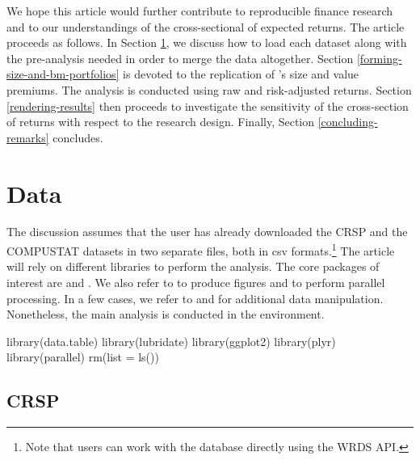 We hope this article would further contribute to reproducible finance research and to our understandings of the cross-sectional of expected returns. 
  The article proceeds as follows. In Section \ref{data}, we discuss how to load each dataset along with the pre-analysis needed in order to merge the data altogether. Section \ref{forming-size-and-bm-portfolios} is devoted to the replication of \cite{fama1993common}'s size and value premiums. The analysis is conducted using raw and risk-adjusted returns. Section \ref{rendering-results} then proceeds to investigate the sensitivity of the cross-section  of returns with respect to the research design. Finally, Section \ref{concluding-remarks} concludes.



\hypertarget{data}{%
\section{Data}\label{data}}

The discussion assumes that the user has already downloaded the CRSP and
the COMPUSTAT datasets in two separate files, both in csv formats.\footnote{Note that users can work with the database directly using the WRDS API.} The article will rely on different  libraries to perform the analysis. The core packages of
interest are   \citep{data.table} and  \citep{lubridate}. 
We also refer to  \citep{ggplot2} to produce figures and  \citep{parallel} to perform parallel processing. 
In a few cases, we refer to  \citep{plyr} and   \citep{dplyr}  for additional data manipulation. Nonetheless, the main analysis is conducted in the
 environment.

\begin{Schunk}
\begin{Sinput}
library(data.table)
library(lubridate)
library(ggplot2)
library(plyr)
library(parallel)
rm(list = ls())
\end{Sinput}
\end{Schunk}

\hypertarget{crsp}{%
\subsection{CRSP}\label{crsp}}


